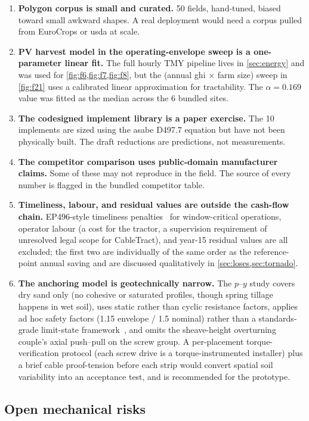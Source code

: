 \documentclass[11pt,a4paper]{article}
\begin{document}
\begin{enumerate}[leftmargin=1.8em,itemsep=0.2em]
    \item \textbf{Polygon corpus is small and curated.} 50 fields, hand-tuned, biased toward small awkward shapes. A real deployment would need a corpus pulled from EuroCrops or \gls{usda} at scale.
    \item \textbf{PV harvest model in the operating-envelope sweep is a one-parameter linear fit.} The full hourly TMY pipeline lives in \cref{sec:energy} and was used for \cref{fig:f6,fig:f7,fig:f8}, but the (annual \gls{ghi} $\times$ farm size) sweep in \cref{fig:f21} uses a calibrated linear approximation for tractability. The $\alpha = 0.169$ value was fitted as the median across the 6 bundled sites.
    \item \textbf{The codesigned implement library is a paper exercise.} The 10 implements are sized using the \gls{asabe} D497.7 equation but have not been physically built. The draft reductions are predictions, not measurements.
    \item \textbf{The competitor comparison uses public-domain manufacturer claims.} Some of these may not reproduce in the field. The source of every number is flagged in the bundled competitor table.
    \item \textbf{Timeliness, labour, and residual values are outside the cash-flow chain.} EP496-style timeliness penalties~\cite{asabe-ep496} for window-critical operations, operator labour (a cost for the tractor, a supervision requirement of unresolved legal scope for CableTract), and year-15 residual values are all excluded; the first two are individually of the same order as the reference-point annual saving and are discussed qualitatively in \cref{sec:loses,sec:tornado}.
    \item \textbf{The anchoring model is geotechnically narrow.} The $p$--$y$ study covers dry sand only (no cohesive or saturated profiles, though spring tillage happens in wet soil), uses static rather than cyclic resistance factors, applies ad hoc safety factors (1.15 envelope / 1.5 nominal) rather than a standards-grade limit-state framework~\cite{ac358,perko2009helical}, and omits the sheave-height overturning couple's axial push--pull on the screw group. A per-placement torque-verification protocol (each screw drive is a torque-instrumented installer) plus a brief cable proof-tension before each strip would convert spatial soil variability into an acceptance test, and is recommended for the prototype.
\end{enumerate}

\subsection{Open mechanical risks}\label{sec:open-risks}
\end{document}
